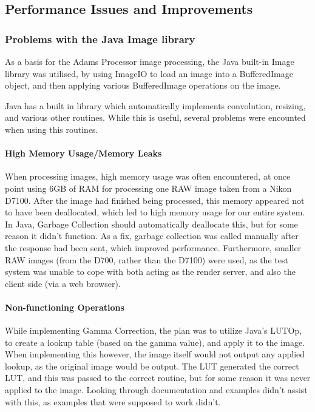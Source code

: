 \documentclass[10pt,a4paper]{article}
\begin{document}
\subsection{Performance Issues and Improvements}
\subsubsection{Problems with the Java Image library}
As a basis for the Adams Processor image processing, the Java built-in Image library was utilised,
by using ImageIO to load an image into a BufferedImage object, and then applying various BufferedImage operations on
the image.

Java has a built in library which automatically implements convolution, resizing, and various other routines. While
this is useful, several problems were encounted when using this routines. 

\paragraph{High Memory Usage/Memory Leaks}
When processing images, high memory usage was often encountered, at once point using 6GB of RAM for processing 
one RAW image taken from a Nikon D7100. After the image had finished being processed, this memory appeared not to
have been deallocated, which led to high memory usage for our entire system. In Java, Garbage Collection should automatically
deallocate this, but for some reason it didn't function. As a fix, garbage collection was called manually after the response had been sent,
which improved performance. Furthermore, smaller RAW images (from the D700, rather than the D7100) were used, as the test system was unable to cope
with both acting as the render server, and also the client side (via a web browser).

\paragraph{Non-functioning Operations}
While implementing Gamma Correction, the plan was to utilize Java's LUTOp, to create a lookup table (based on the gamma value),
and apply it to the image. When implementing this however, the image itself would not output any applied lookup, as the original image would be output.
The LUT generated the correct LUT, and this was passed to the correct routine, but for some reason it was never applied to the image. Looking through
documentation and examples didn't assist with this, as examples that were supposed to work didn't.
\end{document}
